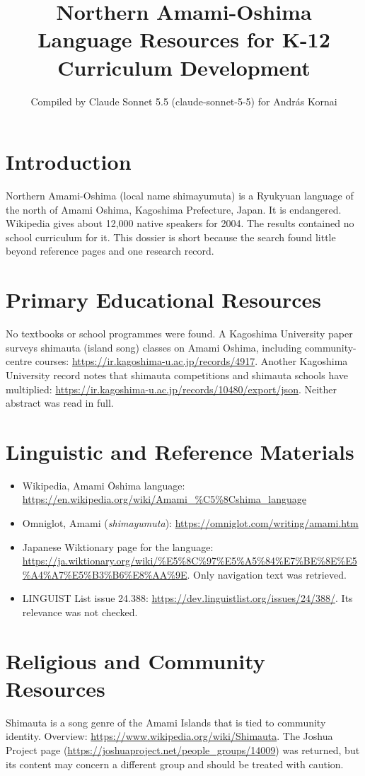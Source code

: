 \documentclass[12pt]{article}
\title{Northern Amami-Oshima Language Resources for K-12 Curriculum Development}
\author{Compiled by Claude Sonnet 5.5 (claude-sonnet-5-5) for Andr\'as Kornai}
\date{}
\begin{document}
\maketitle

\section{Introduction}
Northern Amami-Oshima (local name shimayumuta) is a Ryukyuan language of the north of Amami Oshima, Kagoshima Prefecture, Japan. It is endangered. Wikipedia gives about 12,000 native speakers for 2004. The results contained no school curriculum for it. This dossier is short because the search found little beyond reference pages and one research record.

\section{Primary Educational Resources}
No textbooks or school programmes were found. A Kagoshima University paper surveys shimauta (island song) classes on Amami Oshima, including community-centre courses: \url{https://ir.kagoshima-u.ac.jp/records/4917}. Another Kagoshima University record notes that shimauta competitions and shimauta schools have multiplied: \url{https://ir.kagoshima-u.ac.jp/records/10480/export/json}. Neither abstract was read in full.

\section{Linguistic and Reference Materials}
\begin{itemize}
\item Wikipedia, Amami \=Oshima language: \url{https://en.wikipedia.org/wiki/Amami_%C5%8Cshima_language}
\item Omniglot, Amami (\emph{shimayumuta}): \url{https://omniglot.com/writing/amami.htm}
\item Japanese Wiktionary page for the language: \url{https://ja.wiktionary.org/wiki/%E5%8C%97%E5%A5%84%E7%BE%8E%E5%A4%A7%E5%B3%B6%E8%AA%9E}. Only navigation text was retrieved.
\item LINGUIST List issue 24.388: \url{https://dev.linguistlist.org/issues/24/388/}. Its relevance was not checked.
\end{itemize}

\section{Religious and Community Resources}
Shimauta is a song genre of the Amami Islands that is tied to community identity. Overview: \url{https://www.wikipedia.org/wiki/Shimauta}. The Joshua Project page (\url{https://joshuaproject.net/people_groups/14009}) was returned, but its content may concern a different group and should be treated with caution.
\end{document}
